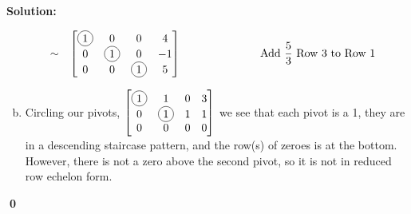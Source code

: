 \documentclass{article}
\newenvironment{solution}
{
  \ignorespaces
  \textbf{Solution:}
}
{
  \ignorespacesafterend
  \begin{flushright}
  {\bfseries \qed}
  \end{flushright}
}
\begin{document}
\begin{solution}
\begin{enumerate}[(a)]
\begin{alignat*}{4}
  &\sim&
  \begin{bmatrix}
  \circledNumber{1} & 0 & 0 & 4 \\
  0 & \circledNumber{1} & 0 & -1 \\
  0 & 0 & \circledNumber{1} & 5
  \end{bmatrix}
  &\hspace{1in} \text{Add \(\frac{5}{3}\) Row 3 to Row 1}& \\
\end{alignat*}
\item Circling our pivots, 
\(\begin{bmatrix}
\circledNumber{1} & 1 & 0 & 3 \\
0 & \circledNumber{1} & 1 & 1 \\
0 & 0 & 0 & 0
\end{bmatrix}\)
we see that each pivot is a 1, they are in a descending staircase pattern, and the row(s) of zeroes is at the bottom. However, there is not a zero above the second pivot, so it is not in reduced row echelon form.
\end{enumerate}
\end{solution}
\end{document}
